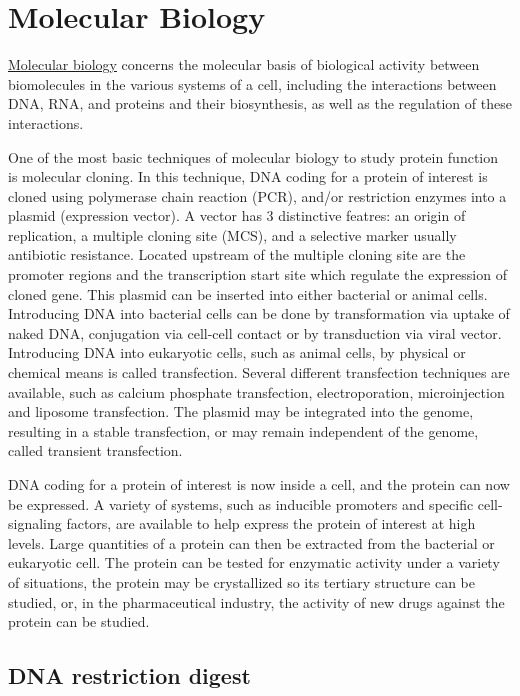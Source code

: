 \chapter{Molecular Biology}\label{molecular-biology}

\href{https://en.wikipedia.org/wiki/Molecular_biology}{Molecular
biology} concerns the molecular basis of biological activity between
biomolecules in the various systems of a cell, including the
interactions between DNA, RNA, and proteins and their biosynthesis, as
well as the regulation of these interactions.

One of the most basic techniques of molecular biology to study protein
function is molecular cloning. In this technique, DNA coding for a
protein of interest is cloned using polymerase chain reaction (PCR),
and/or restriction enzymes into a plasmid (expression vector). A vector
has 3 distinctive featres: an origin of replication, a multiple cloning
site (MCS), and a selective marker usually antibiotic resistance.
Located upstream of the multiple cloning site are the promoter regions
and the transcription start site which regulate the expression of cloned
gene. This plasmid can be inserted into either bacterial or animal
cells. Introducing DNA into bacterial cells can be done by
transformation via uptake of naked DNA, conjugation via cell-cell
contact or by transduction via viral vector. Introducing DNA into
eukaryotic cells, such as animal cells, by physical or chemical means is
called transfection. Several different transfection techniques are
available, such as calcium phosphate transfection, electroporation,
microinjection and liposome transfection. The plasmid may be integrated
into the genome, resulting in a stable transfection, or may remain
independent of the genome, called transient transfection.

DNA coding for a protein of interest is now inside a cell, and the
protein can now be expressed. A variety of systems, such as inducible
promoters and specific cell-signaling factors, are available to help
express the protein of interest at high levels. Large quantities of a
protein can then be extracted from the bacterial or eukaryotic cell. The
protein can be tested for enzymatic activity under a variety of
situations, the protein may be crystallized so its tertiary structure
can be studied, or, in the pharmaceutical industry, the activity of new
drugs against the protein can be studied.

\section{DNA restriction digest}\label{dna-restriction-digest}

